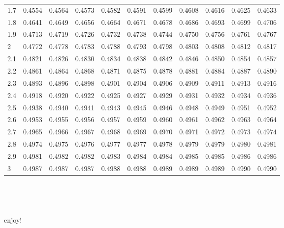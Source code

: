 \documentclass[]{tufte-handout}
\begin{document}
\begin{longtable}[]{@{}lrrrrrrrrrr@{}}
1.7 & 0.4554 & 0.4564 & 0.4573 & 0.4582 & 0.4591 & 0.4599 & 0.4608 &
0.4616 & 0.4625 & 0.4633 \\
1.8 & 0.4641 & 0.4649 & 0.4656 & 0.4664 & 0.4671 & 0.4678 & 0.4686 &
0.4693 & 0.4699 & 0.4706 \\
1.9 & 0.4713 & 0.4719 & 0.4726 & 0.4732 & 0.4738 & 0.4744 & 0.4750 &
0.4756 & 0.4761 & 0.4767 \\
2 & 0.4772 & 0.4778 & 0.4783 & 0.4788 & 0.4793 & 0.4798 & 0.4803 &
0.4808 & 0.4812 & 0.4817 \\
2.1 & 0.4821 & 0.4826 & 0.4830 & 0.4834 & 0.4838 & 0.4842 & 0.4846 &
0.4850 & 0.4854 & 0.4857 \\
2.2 & 0.4861 & 0.4864 & 0.4868 & 0.4871 & 0.4875 & 0.4878 & 0.4881 &
0.4884 & 0.4887 & 0.4890 \\
2.3 & 0.4893 & 0.4896 & 0.4898 & 0.4901 & 0.4904 & 0.4906 & 0.4909 &
0.4911 & 0.4913 & 0.4916 \\
2.4 & 0.4918 & 0.4920 & 0.4922 & 0.4925 & 0.4927 & 0.4929 & 0.4931 &
0.4932 & 0.4934 & 0.4936 \\
2.5 & 0.4938 & 0.4940 & 0.4941 & 0.4943 & 0.4945 & 0.4946 & 0.4948 &
0.4949 & 0.4951 & 0.4952 \\
2.6 & 0.4953 & 0.4955 & 0.4956 & 0.4957 & 0.4959 & 0.4960 & 0.4961 &
0.4962 & 0.4963 & 0.4964 \\
2.7 & 0.4965 & 0.4966 & 0.4967 & 0.4968 & 0.4969 & 0.4970 & 0.4971 &
0.4972 & 0.4973 & 0.4974 \\
2.8 & 0.4974 & 0.4975 & 0.4976 & 0.4977 & 0.4977 & 0.4978 & 0.4979 &
0.4979 & 0.4980 & 0.4981 \\
2.9 & 0.4981 & 0.4982 & 0.4982 & 0.4983 & 0.4984 & 0.4984 & 0.4985 &
0.4985 & 0.4986 & 0.4986 \\
3 & 0.4987 & 0.4987 & 0.4987 & 0.4988 & 0.4988 & 0.4989 & 0.4989 &
0.4989 & 0.4990 & 0.4990 \\
\bottomrule
\end{longtable}

　

　

enjoy!


\end{document}

